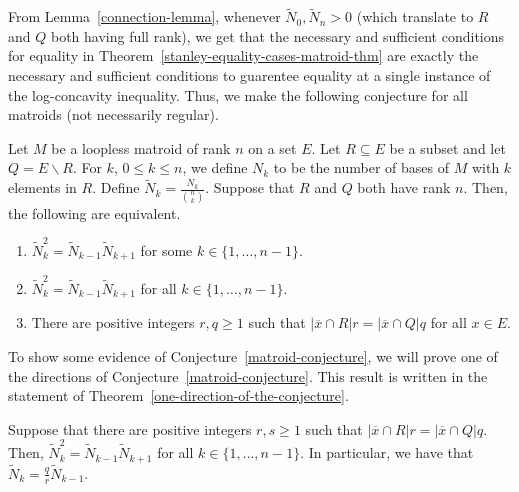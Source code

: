\documentclass{puthesis-UG}
\begin{document}
From Lemma~\ref{connection-lemma}, whenever $\widetilde{N}_0, \widetilde{N}_n > 0$ (which translate to $R$ and $Q$ both having full rank), we get that the necessary and sufficient conditions for equality in Theorem~\ref{stanley-equality-cases-matroid-thm} are exactly the necessary and sufficient conditions to guarentee equality at a single instance of the log-concavity inequality. Thus, we make the following conjecture for all matroids (not necessarily regular). 

\begin{conj} \label{matroid-conjecture}
	Let $M$ be a loopless matroid of rank $n$ on a set $E$. Let $R \subseteq E$ be a subset and let $Q = E \backslash R$. For $k$, $0 \leq k \leq n$, we define $N_k$ to be the number of bases of $M$ with $k$ elements in $R$. Define $\widetilde{N}_k = \frac{N_k}{\binom{n}{k}}$. Suppose that $R$ and $Q$ both have rank $n$. Then, the following are equivalent. 
	\begin{enumerate}[label = (\alph*)]
		\item $\widetilde{N}_k^2 = \widetilde{N}_{k-1} \widetilde{N}_{k+1}$ for some $k \in \{1, \ldots, n-1\}$. 

		\item $\widetilde{N}_k^2 = \widetilde{N}_{k-1} \widetilde{N}_{k+1}$ for all $k \in \{1, \ldots, n-1\}$.

		\item There are positive integers $r, q \geq 1$ such that $|\overline{x} \cap R| r = |\overline{x} \cap Q| q$ for all $x \in E$. 
	\end{enumerate}
\end{conj}

To show some evidence of Conjecture~\ref{matroid-conjecture}, we will prove one of the directions of Conjecture~\ref{matroid-conjecture}. This result is written in the statement of Theorem~\ref{one-direction-of-the-conjecture}.

\begin{thm} \label{one-direction-of-the-conjecture}
	Suppose that there are positive integers $r, s \geq 1$ such that $| \overline{x} \cap R| r = |\overline{x} \cap Q| q$. Then, $\widetilde{N}_k^2 = \widetilde{N}_{k-1} \widetilde{N}_{k+1}$ for all $k \in \{1, \ldots, n-1\}$. In particular, we have that $\widetilde{N}_k = \frac{q}{r} \widetilde{N}_{k-1}$. 
\end{thm}
\end{document}
